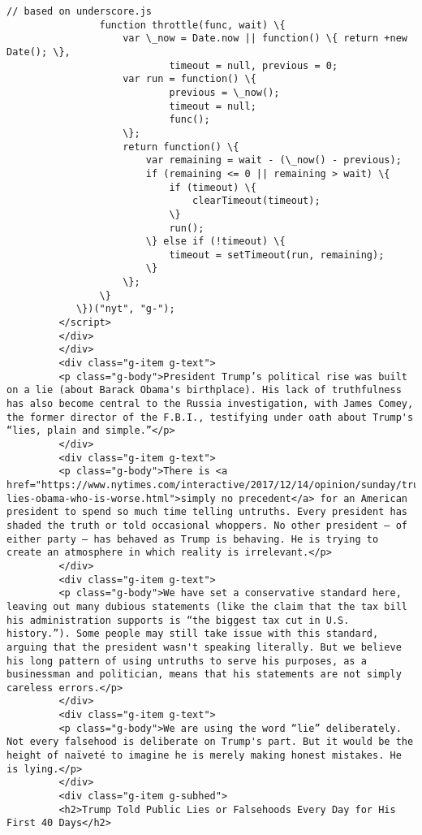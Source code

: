 \documentclass[11pt]{article}
\begin{document}
\begin{Verbatim}[commandchars=\\\{\}]
         		// based on underscore.js
         		function throttle(func, wait) \{
         			var \_now = Date.now || function() \{ return +new Date(); \},
         					timeout = null, previous = 0;
         			var run = function() \{
         					previous = \_now();
         					timeout = null;
         					func();
         			\};
         			return function() \{
         				var remaining = wait - (\_now() - previous);
         				if (remaining <= 0 || remaining > wait) \{
         					if (timeout) \{
         						clearTimeout(timeout);
         					\}
         					run();
         				\} else if (!timeout) \{
         					timeout = setTimeout(run, remaining);
         				\}
         			\};
         		\}
         	\})("nyt", "g-");
         </script>
         </div>
         </div>
         <div class="g-item g-text">
         <p class="g-body">President Trump’s political rise was built on a lie (about Barack Obama's birthplace). His lack of truthfulness has also become central to the Russia investigation, with James Comey, the former director of the F.B.I., testifying under oath about Trump's “lies, plain and simple.”</p>
         </div>
         <div class="g-item g-text">
         <p class="g-body">There is <a href="https://www.nytimes.com/interactive/2017/12/14/opinion/sunday/trump-lies-obama-who-is-worse.html">simply no precedent</a> for an American president to spend so much time telling untruths. Every president has shaded the truth or told occasional whoppers. No other president — of either party — has behaved as Trump is behaving. He is trying to create an atmosphere in which reality is irrelevant.</p>
         </div>
         <div class="g-item g-text">
         <p class="g-body">We have set a conservative standard here, leaving out many dubious statements (like the claim that the tax bill his administration supports is “the biggest tax cut in U.S. history.”). Some people may still take issue with this standard, arguing that the president wasn't speaking literally. But we believe his long pattern of using untruths to serve his purposes, as a businessman and politician, means that his statements are not simply careless errors.</p>
         </div>
         <div class="g-item g-text">
         <p class="g-body">We are using the word “lie” deliberately. Not every falsehood is deliberate on Trump's part. But it would be the height of naïveté to imagine he is merely making honest mistakes. He is lying.</p>
         </div>
         <div class="g-item g-subhed">
         <h2>Trump Told Public Lies or Falsehoods Every Day for His First 40 Days</h2>

\end{Verbatim}
\end{document}
